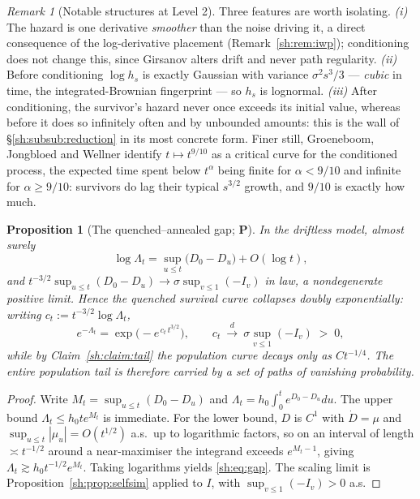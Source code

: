 \documentclass[11pt]{article}
\numberwithin{equation}{section}
\theoremstyle{plain}
\newtheorem{proposition}[theorem]{Proposition}
\theoremstyle{definition}
\theoremstyle{remark}
\newtheorem{remark}[theorem]{Remark}
\begin{document}
\begin{remark}[Notable structures at Level 2]\label{sh:rem:sheet:L2}
Three features are worth isolating. \emph{(i)} The hazard is one
derivative \emph{smoother} than the noise driving it, a direct
consequence of the log-derivative placement
(Remark~\ref{sh:rem:iwp}); conditioning does not change this, since
Girsanov alters drift and never path regularity. \emph{(ii)} Before
conditioning $\log h_s$ is exactly Gaussian with variance
$\sigma^2s^3/3$ --- \emph{cubic} in time, the integrated-Brownian
fingerprint --- so $h_s$ is lognormal. \emph{(iii)} After conditioning,
the survivor's hazard never once exceeds its initial value, whereas
before it does so infinitely often and by unbounded amounts: this is the
wall of \S\ref{sh:subsub:reduction} in its most concrete form. Finer
still, Groeneboom, Jongbloed and Wellner \cite{GJW99} identify
$t\mapsto t^{9/10}$ as a critical curve for the conditioned process, the
expected time spent below $t^\alpha$ being finite for $\alpha<9/10$ and
infinite for $\alpha\ge9/10$: survivors do lag their typical
$s^{3/2}$ growth, and $9/10$ is exactly how much.
\end{remark}

\begin{proposition}[The quenched--annealed gap; \textbf{P}]
\label{sh:prop:gap}
In the driftless model, almost surely
\begin{equation}\label{sh:eq:gap}
\log\Lambda_t=\sup_{u\le t}\bigl(D_0-D_u\bigr)+O(\log t),
\end{equation}
and $t^{-3/2}\sup_{u\le t}(D_0-D_u)\to\sigma\sup_{v\le1}(-I_v)$ in law, a
nondegenerate positive limit. Hence the quenched survival curve
collapses \emph{doubly exponentially}: writing
$c_t:=t^{-3/2}\log\Lambda_t$,
\[
e^{-\Lambda_t}=\exp\bigl(-e^{\,c_t\,t^{3/2}}\bigr),
\qquad
c_t\ \xrightarrow{\;d\;}\ \sigma\sup_{v\le1}(-I_v)\;>\;0,
\]
while by Claim~\ref{sh:claim:tail} the population curve decays only as
$Ct^{-1/4}$. The entire population tail is therefore carried by a set of
paths of vanishing probability.
\end{proposition}

\begin{proof}
Write $M_t=\sup_{u\le t}(D_0-D_u)$ and
$\Lambda_t=h_0\int_0^te^{D_0-D_u}du$. The upper bound
$\Lambda_t\le h_0te^{M_t}$ is immediate. For the lower bound, $D$ is
$C^1$ with $\dot D=\mu$ and $\sup_{u\le t}|\mu_u|=O(t^{1/2})$ a.s.\ up to
logarithmic factors, so on an interval of length $\asymp t^{-1/2}$ around
a near-maximiser the integrand exceeds $e^{M_t-1}$, giving
$\Lambda_t\gtrsim h_0t^{-1/2}e^{M_t}$. Taking logarithms yields
\eqref{sh:eq:gap}. The scaling limit is
Proposition~\ref{sh:prop:selfsim} applied to $I$, with
$\sup_{v\le1}(-I_v)>0$ a.s.
\end{proof}
\end{document}
